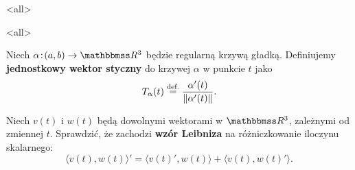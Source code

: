 \mode*
\mode<all>{}

\mode<all>{}
\begin{frame}[<+->]
\begin{definicja}
Niech $\alpha\colon (a,b)\to \R^3$ będzie regularną krzywą gładką. Definiujemy \textbf{jednostkowy wektor styczny} do krzywej $\alpha$ w punkcie $t$ jako \[T_\alpha(t)\define\frac{\alpha'(t)}{\|\alpha'(t)\|}.\]
\end{definicja}

\begin{center}
\begin{tikzpicture}[y=0.80pt, x=0.8pt,scale=0.5,yscale=-1, inner sep=0pt, outer sep=0pt]

\end{tikzpicture}
\end{center}

\end{frame}
\begin{frame}
 \begin{exercise}
  Niech $v(t)$ i $w(t)$ będą dowolnymi wektorami w $\R^3$, zależnymi od zmiennej $t$. Sprawdzić, że zachodzi \textbf{wz\'or Leibniza} na r\'ożniczkowanie iloczynu skalarnego:
\[\langle v(t),w(t) \rangle'=\langle v(t)',w(t) \rangle+\langle v(t),w(t)' \rangle.\]
 \end{exercise}

\end{frame}


